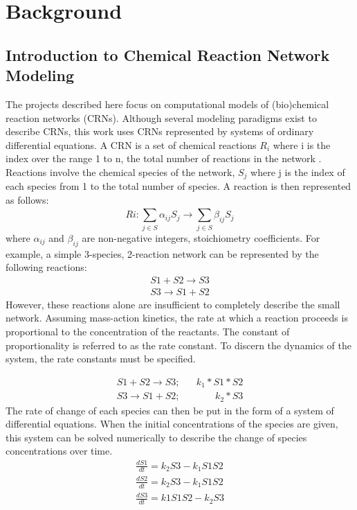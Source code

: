 \documentclass[12pt]{report}
\begin{document}
\chapter{Background}

\section{Introduction to Chemical Reaction Network Modeling}
The projects described here focus on computational models of (bio)chemical reaction networks (CRNs). Although several modeling paradigms exist to describe CRNs, this work uses CRNs represented by systems of ordinary differential equations. A CRN is a set of chemical reactions $R_i$ where i is the index over the range 1 to n, the total number of reactions in the network . Reactions involve the chemical species of the network, $S_j$ where j is the index of each species from 1 to the total number of species. A reaction is then represented as follows:
\begin{equation*}
Ri: \sum_{j\in S}^{}\alpha_{ij}S_j\to \sum_{j\in S}^{}\beta_{ij}S_j
\end{equation*}
where $\alpha_{ij}$ and $\beta_{ij}$ are non-negative integers, stoichiometry coefficients. For example, a simple 3-species, 2-reaction network can be represented by the following reactions:
\begin{equation}
\begin{split}
S1 + S2 \to S3 \\
S3 \to S1 + S2
\end{split}
\end{equation}
However, these reactions alone are insufficient to completely describe the small network.  Assuming mass-action kinetics, the rate at which a reaction proceeds is proportional to the concentration of the reactants. The constant of proportionality is referred to as the rate constant. To discern the dynamics of the system, the rate constants must be specified.

\begin{equation}
\begin{split}
S1 + S2 \to S3; \;\;\;\;\;\; k_1*S1*S2\\
S3 \to S1 + S2; \;\;\;\;\;\;\;\;\;\;\;\;\; k_2*S3
\end{split}
\end{equation}
The rate of change of each species can then be put in the form of a system of differential equations. When the initial concentrations of the species are given, this system can be solved numerically to describe the change of species concentrations over time.
\begin{equation}
\begin{split}
\frac{dS1}{dt}=k_2S3 - k_1S1S2\\
\frac{dS2}{dt}=k_2S3 -k_1S1S2\\
\frac{dS3}{dt}=k1S1S2 - k_2S3
\end{split}
\end{equation}
\end{document}

